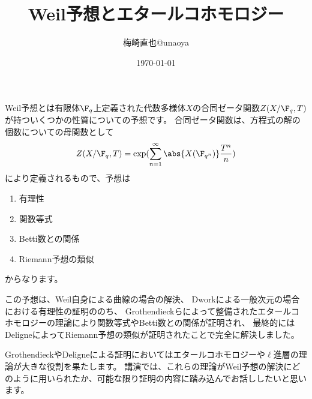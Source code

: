 \documentclass[uplatex]{jsarticle}
\title{Weil予想とエタールコホモロジー}
\author{梅崎直也@unaoya}
\date{\today}
\begin{document}
\maketitle

Weil予想とは有限体$\F_q$上定義された代数多様体$X$の合同ゼータ関数$Z(X/\F_q,T)$が持ついくつかの性質についての予想です。
合同ゼータ関数は、方程式の解の個数についての母関数として
\begin{align*}
  Z(X/\F_q,T)=\exp(\sum_{n=1}^\infty\abs{X(\F_{q^n})}\frac{T^n}{n})
\end{align*}
により定義されるもので、予想は
\begin{enumerate}
\item 有理性
\item 関数等式
\item Betti数との関係
\item Riemann予想の類似
\end{enumerate}
からなります。

この予想は、Weil自身による曲線の場合の解決、
Dworkによる一般次元の場合における有理性の証明ののち、
Grothendieckらによって整備されたエタールコホモロジーの理論により関数等式やBetti数との関係が証明され、
最終的にはDeligneによってRiemann予想の類似が証明されたことで完全に解決しました。

GrothendieckやDeligneによる証明においてはエタールコホモロジーや$\ell$進層の理論が大きな役割を果たします。
講演では、これらの理論がWeil予想の解決にどのように用いられたか、可能な限り証明の内容に踏み込んでお話ししたいと思います。
\end{document}
